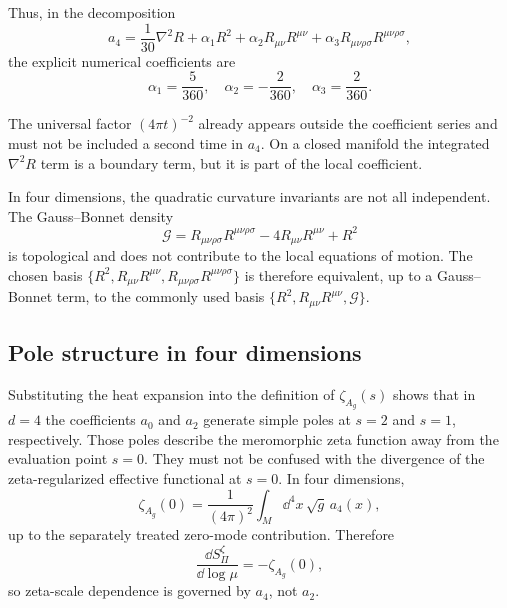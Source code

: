\documentclass[pdflatex,sn-mathphys-num]{sn-jnl} %
\theoremstyle{remark}
\theoremstyle{plain}
\begin{document}
    Thus, in the decomposition
    \begin{equation}
      a_4
      =
      \frac{1}{30}\nabla^2R
      +
      \alpha_1 R^2
      +
      \alpha_2 R_{\mu\nu} R^{\mu\nu}
      +
      \alpha_3 R_{\mu\nu\rho\sigma} R^{\mu\nu\rho\sigma},
    \end{equation}
    the explicit numerical coefficients are
    \begin{equation}
      \alpha_1
      =
      \frac{5}{360},
      \quad
      \alpha_2
      =
      -\frac{2}{360},
      \quad
      \alpha_3
      =
      \frac{2}{360}.
    \end{equation}

    The universal factor $(4\pi t)^{-2}$ already appears outside the coefficient series and must not be included a
    second time in $a_4$.
    On a closed manifold the integrated $\nabla^2R$ term is a boundary term, but it is part of the local coefficient.

    In four dimensions, the quadratic curvature invariants are not all
    independent.
    The Gauss--Bonnet density
    \begin{equation}
      \mathcal{G}
      =
      R_{\mu\nu\rho\sigma} R^{\mu\nu\rho\sigma}
      -
      4 R_{\mu\nu} R^{\mu\nu}
      +
      R^2
    \end{equation}
    is topological and does not contribute to the local equations of motion.
    The chosen basis $\{R^2, R_{\mu\nu}R^{\mu\nu},
  R_{\mu\nu\rho\sigma}R^{\mu\nu\rho\sigma}\}$ is therefore equivalent,
    up to a Gauss--Bonnet term, to the commonly used basis
    $\{R^2, R_{\mu\nu}R^{\mu\nu}, \mathcal{G}\}$.

  \subsection{Pole structure in four dimensions}
    \label{subsec:pole-structure}

    Substituting the heat expansion into the definition of $\zeta_{A_g}(s)$
    shows that in $d=4$ the coefficients $a_0$ and $a_2$ generate simple poles
    at $s=2$ and $s=1$, respectively.
    Those poles describe the meromorphic zeta function away from the evaluation point $s=0$.
    They must not be confused with the divergence of the zeta-regularized effective functional at $s=0$.
    In four dimensions,
    \begin{equation}
      \zeta_{A_g}(0)
      =
      \frac{1}{(4\pi)^2}
      \int_M\dd^4x\,\sqrt{g}\,a_4(x),
      \label{eq:zeta-zero-a4}
    \end{equation}
    up to the separately treated zero-mode contribution.
    Therefore
    \begin{equation}
      \frac{\dd S_\Pi^\zeta}{\dd\log\mu}
      =
      -\zeta_{A_g}(0),
      \label{eq:zeta-running-a4}
    \end{equation}
    so zeta-scale dependence is governed by $a_4$, not $a_2$.
\end{document}
